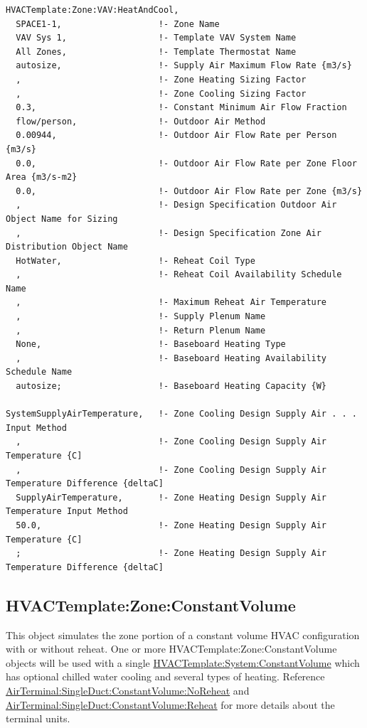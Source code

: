 \begin{lstlisting}
HVACTemplate:Zone:VAV:HeatAndCool,
  SPACE1-1,                   !- Zone Name
  VAV Sys 1,                  !- Template VAV System Name
  All Zones,                  !- Template Thermostat Name
  autosize,                   !- Supply Air Maximum Flow Rate {m3/s}
  ,                           !- Zone Heating Sizing Factor
  ,                           !- Zone Cooling Sizing Factor
  0.3,                        !- Constant Minimum Air Flow Fraction
  flow/person,                !- Outdoor Air Method
  0.00944,                    !- Outdoor Air Flow Rate per Person {m3/s}
  0.0,                        !- Outdoor Air Flow Rate per Zone Floor Area {m3/s-m2}
  0.0,                        !- Outdoor Air Flow Rate per Zone {m3/s}
  ,                           !- Design Specification Outdoor Air Object Name for Sizing
  ,                           !- Design Specification Zone Air Distribution Object Name
  HotWater,                   !- Reheat Coil Type
  ,                           !- Reheat Coil Availability Schedule Name
  ,                           !- Maximum Reheat Air Temperature
  ,                           !- Supply Plenum Name
  ,                           !- Return Plenum Name
  None,                       !- Baseboard Heating Type
  ,                           !- Baseboard Heating Availability Schedule Name
  autosize;                   !- Baseboard Heating Capacity {W}

SystemSupplyAirTemperature,   !- Zone Cooling Design Supply Air . . . Input Method
  ,                           !- Zone Cooling Design Supply Air Temperature {C]
  ,                           !- Zone Cooling Design Supply Air Temperature Difference {deltaC]
  SupplyAirTemperature,       !- Zone Heating Design Supply Air Temperature Input Method
  50.0,                       !- Zone Heating Design Supply Air Temperature {C]
  ;                           !- Zone Heating Design Supply Air Temperature Difference {deltaC]
\end{lstlisting}

\subsection{HVACTemplate:Zone:ConstantVolume}\label{hvactemplatezoneconstantvolume}

This object simulates the zone portion of a constant volume HVAC configuration with or without reheat. One or more HVACTemplate:Zone:ConstantVolume objects will be used with a single \hyperref[hvactemplatesystemconstantvolume]{HVACTemplate:System:ConstantVolume} which has optional chilled water cooling and several types of heating. Reference \hyperref[airterminalsingleductconstantvolumenoreheat]{AirTerminal:SingleDuct:ConstantVolume:NoReheat} and \hyperref[airterminalsingleductconstantvolumereheat]{AirTerminal:SingleDuct:ConstantVolume:Reheat} for more details about the terminal units.


